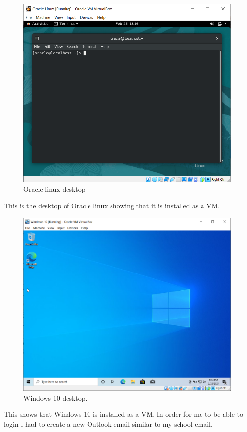 \begin{figure}[H]
    \centering
    \includegraphics[width=\linewidth]{figures/Oracle-Home.png}
    \caption{Oracle linux desktop}
\end{figure}
This is the desktop of Oracle linux showing that it is installed as a VM.

\begin{figure}[H]
    \centering
    \includegraphics[width=\linewidth]{figures/Windows-10-Home.png}
    \caption{Windows 10 desktop.}
\end{figure}
This shows that Windows 10 is installed as a VM.
In order for me to be able to login I had to create a new Outlook email similar to my school email.


